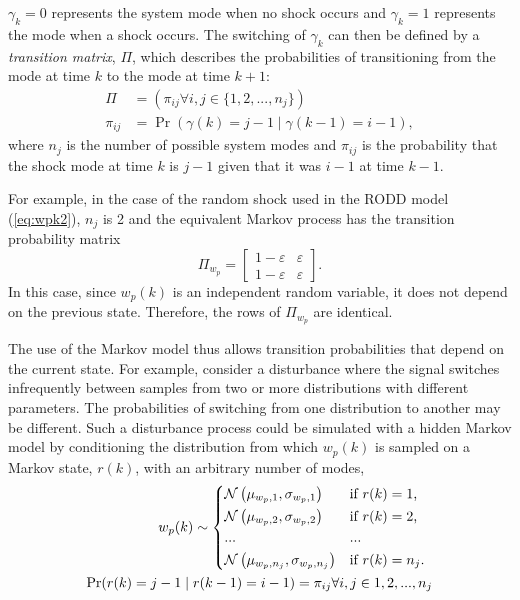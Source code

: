 $\gamma_k=0$ represents the system mode when no shock occurs and $\gamma_k=1$ represents the mode when a shock occurs. The switching of $\gamma_k$ can then be defined by a \textit{transition matrix}, $\Pi$, which describes the probabilities of transitioning from the mode at time $k$ to the mode at time $k+1$:
\begin{equation} \label{eq:Pi}
	\begin{aligned}
	\Pi &= \left(\pi_{ij} \forall i,j\in \{1,2,...,n_j\}\right) \\
	\pi_{ij} &= \Pr\left( \gamma(k)=j-1 \mid \gamma(k-1)=i-1 \right),
	\end{aligned}
\end{equation}
%
%
where $n_j$ is the number of possible system modes and $\pi_{ij}$ is the probability that the shock mode at time $k$ is $j-1$ given that it was $i-1$ at time $k-1$.

For example, in the case of the random shock used in the \gls{RODD} model (\ref{eq:wpk2}), $n_j$ is 2 and the equivalent Markov process has the transition probability matrix
%
\begin{equation} \label{eq:Pi-RODD-step}
	\Pi_{w_{p}} = \begin{bmatrix}
	1-\varepsilon & \varepsilon \\
	1-\varepsilon & \varepsilon
	\end{bmatrix}.
\end{equation}
In this case, since $w_{p}(k)$ is an independent random variable, it does not depend on the previous state. Therefore, the rows of $\Pi_{w_{p}}$ are identical.

The use of the Markov model thus allows transition probabilities that depend on the current state. For example, consider a disturbance where the signal switches infrequently between samples from two or more distributions with different parameters. The probabilities of switching from one distribution to another may be different. Such a disturbance process could be simulated with a hidden Markov model by conditioning the distribution from which $w_p(k)$ is sampled on a Markov state, $r(k)$, with an arbitrary number of modes,
\begin{equation} \label{eq:mog-example}
	\begin{split}
		w_p(k) \sim 
		\begin{cases*}
			\mathcal{N}\left(\mu_{w_p,1}, \sigma_{w_p,1}\right) & if $r(k)=1$, \\
			\mathcal{N}\left(\mu_{w_p,2}, \sigma_{w_p,2}\right) & if $r(k)=2$, \\
			... & ...\\
			\mathcal{N}\left(\mu_{w_p,n_j}, \sigma_{w_p,n_j}\right) & if $r(k)=n_j$.
		\end{cases*} \\
	\Pr(r(k)=j-1 \mid r(k-1)=i-1)=\pi_{ij} \forall i,j \in {1,2,...,n_j}
	\end{split}
\end{equation}
%

